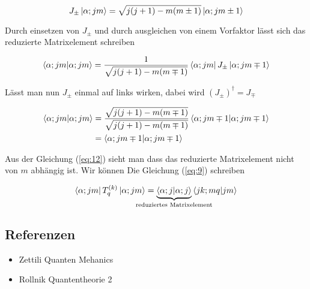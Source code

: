 \begin{equation}
  \label{eq:11}
  J_{\pm}\left| \alpha; jm \right\rangle = \sqrt{j(j+1)-m(m\pm 1)} \left| \alpha; jm\pm 1 \right\rangle
\end{equation}

Durch einsetzen von \(J_{\pm}\) und durch ausgleichen von einem Vorfaktor lässt sich das reduzierte Matrixelement schreiben


\begin{align}
  \label{eq:10}
  \braket{\alpha;jm}{\alpha; jm} = \frac{1}{\sqrt{j(j+1)-m(m\mp 1)}}  \bra{\alpha;jm}J_{\pm} \ket{\alpha; jm\mp 1}
\end{align}

Lässt man nun \(J_{\pm}\) einmal auf links wirken, dabei wird \((J_{\pm})^\dagger = J_{\mp}\)

\begin{align}
  \label{eq:12}
  \braket{\alpha;jm}{\alpha; jm} &= \frac{\sqrt{j(j+1)-m(m\mp 1)}}{\sqrt{j(j+1)-m(m\mp 1)}}  \braket{\alpha;jm\mp 1 }{\alpha; jm\mp 1} \notag \\
&= \braket{\alpha;jm\mp 1 }{\alpha; jm\mp 1}
\end{align}

Aus der Gleichung (\ref{eq:12}) sieht man dass das reduzierte Matrixelement nicht von \(m\) abhängig ist. Wir können Die Gleichung (\ref{eq:9}) schreiben

\begin{equation}
  \label{eq:14}
   \bra{\alpha;jm} T^{(k)}_q  \ket{\alpha;jm} =  \underbr{\braket{\alpha;j}{\alpha; j}}_{\text{reduziertes Matrixelement}}   \braket{jk;mq}{jm}
\end{equation}





\subsection*{Referenzen}
\begin{itemize}
\item Zettili Quanten Mehanics
\item Rollnik Quantentheorie 2
\end{itemize}


